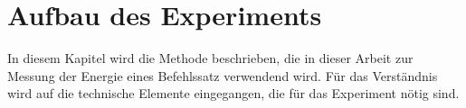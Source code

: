 \chapter{Aufbau des Experiments}

In diesem Kapitel wird die Methode beschrieben, die in dieser Arbeit zur Messung der Energie eines Befehlssatz verwendend wird. Für das Verständnis wird auf die technische Elemente eingegangen, die für das Experiment nötig sind. 